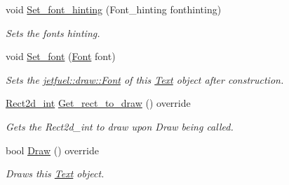 \begin{DoxyCompactItemize}
void \hyperlink{classjetfuel_1_1draw_1_1Text_ada69de19f3ea2373120e37f9f61eeb6d}{Set\+\_\+font\+\_\+hinting} (Font\+\_\+hinting fonthinting)
\begin{DoxyCompactList}\small\item\em Sets the font\textquotesingle{}s hinting. \end{DoxyCompactList}\item 
void \hyperlink{classjetfuel_1_1draw_1_1Text_a8b8f2cd4cda3d31098cc0f5535fb7f7a}{Set\+\_\+font} (\hyperlink{classjetfuel_1_1draw_1_1Font}{Font} font)
\begin{DoxyCompactList}\small\item\em Sets the \hyperlink{classjetfuel_1_1draw_1_1Font}{jetfuel\+::draw\+::\+Font} of this \hyperlink{classjetfuel_1_1draw_1_1Text}{Text} object after construction. \end{DoxyCompactList}\item 
\hyperlink{classjetfuel_1_1draw_1_1Rect2d}{Rect2d\+\_\+int} \hyperlink{classjetfuel_1_1draw_1_1Text_a362996e996d471729944eebdff1f7636}{Get\+\_\+rect\+\_\+to\+\_\+draw} () override
\begin{DoxyCompactList}\small\item\em Gets the Rect2d\+\_\+int to draw upon Draw being called. \end{DoxyCompactList}\item 
bool \hyperlink{classjetfuel_1_1draw_1_1Text_ac0b8a614277d6b575c52d127e9a673f2}{Draw} () override
\begin{DoxyCompactList}\small\item\em Draws this \hyperlink{classjetfuel_1_1draw_1_1Text}{Text} object. \end{DoxyCompactList}\end{DoxyCompactItemize}

